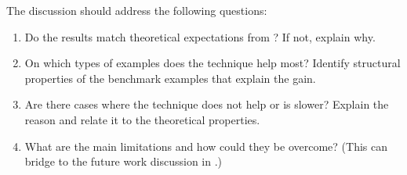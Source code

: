 The discussion should address the following questions:
\begin{enumerate}
    \item Do the results match theoretical expectations from ?
          If not, explain why.
    \item On which types of examples does the technique help most? 
          Identify structural properties of the benchmark examples that explain the gain.
    \item Are there cases where the technique does not help or is slower?
          Explain the reason and relate it to the theoretical properties.
    \item What are the main limitations and how could they be overcome?
          (This can bridge to the future work discussion in .)
\end{enumerate}
